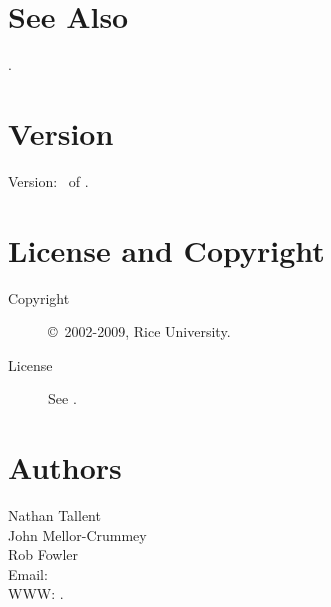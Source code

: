 \documentclass[english]{article}
\begin{document}





\section{See Also}

.

\section{Version}

Version: \Version\ of \Date.

\section{License and Copyright}

\begin{description}
\item[Copyright] \copyright\ 2002-2009, Rice University.
\item[License] See .
\end{description}

\section{Authors}

\noindent
Nathan Tallent \\
John Mellor-Crummey \\
Rob Fowler \\
Email:  \\
WWW: .

\LatexManEnd
\end{document}
